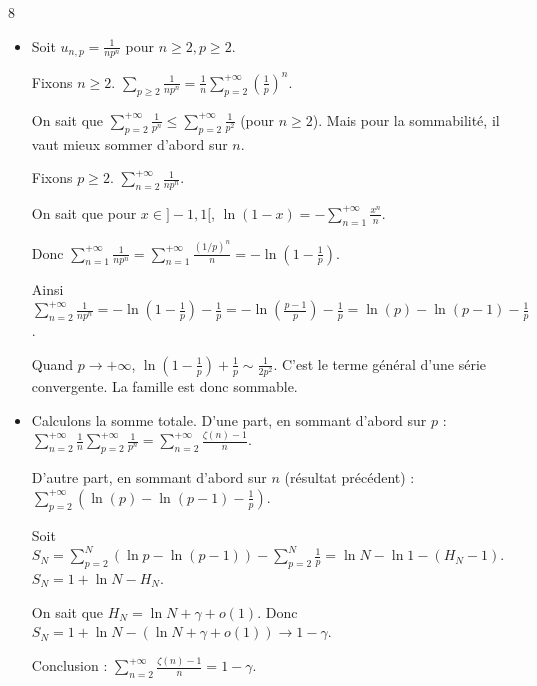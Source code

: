 \begin{correction}{8}
\begin{itemize}
    \item 
        Soit $u_{n,p} = \frac{1}{n p^n}$ pour $n \ge 2, p \ge 2$.

        Fixons $n \geqslant 2$. $\displaystyle \sum_{p \ge 2} \frac{1}{n p^n} = \frac{1}{n} \sum_{p=2}^{+\infty} \left(\frac{1}{p}\right)^n$.
        
        On sait que $\displaystyle \sum_{p=2}^{+\infty} \frac{1}{p^n} \le \sum_{p=2}^{+\infty} \frac{1}{p^2}$ (pour $n \ge 2$).
        Mais pour la sommabilité, il vaut mieux sommer d'abord sur $n$.
        
        Fixons $p \ge 2$. $\displaystyle\sum_{n=2}^{+\infty} \frac{1}{n p^n}$.
        
        On sait que pour $x \in ]-1,1[$, $\displaystyle\ln(1-x) = -\sum_{n=1}^{+\infty} \frac{x^n}{n}$.

        Donc $\displaystyle \sum_{n=1}^{+\infty} \frac{1}{n p^n} = \sum_{n=1}^{+\infty} \frac{(1/p)^n}{n} = -\ln\left(1-\frac{1}{p}\right)$.

        Ainsi $\displaystyle \sum_{n=2}^{+\infty} \frac{1}{n p^n} = -\ln\left(1-\frac{1}{p}\right) - \frac{1}{p} = -\ln\left(\frac{p-1}{p}\right) - \frac{1}{p} = \ln(p) - \ln(p-1) - \frac{1}{p}$.

        Quand $p \to +\infty$, $\ln\left(1-\frac{1}{p}\right) + \frac{1}{p} \sim \frac{1}{2p^2}$.
        C'est le terme général d'une série convergente.
        La famille est donc sommable.
    \item 
        Calculons la somme totale.
        D'une part, en sommant d'abord sur $p$ :
        $\displaystyle \sum_{n=2}^{+\infty} \frac{1}{n} \sum_{p=2}^{+\infty} \frac{1}{p^n} = \sum_{n=2}^{+\infty} \frac{\zeta(n)-1}{n}$.

        D'autre part, en sommant d'abord sur $n$ (résultat précédent) :
        $\displaystyle \sum_{p=2}^{+\infty} \left(\ln(p) - \ln(p-1) - \frac{1}{p}\right)$.
        
        Soit $\displaystyle S_N = \sum_{p=2}^N (\ln p - \ln(p-1)) - \sum_{p=2}^N \frac{1}{p} = \ln N - \ln 1 - (H_N - 1)$.
        $S_N = 1 + \ln N - H_N$.

        On sait que $H_N = \ln N + \gamma + o(1)$.
        Donc $S_N = 1 + \ln N - (\ln N + \gamma + o(1)) \to 1 - \gamma$.

        Conclusion : $\displaystyle \sum_{n=2}^{+\infty} \frac{\zeta(n)-1}{n} = 1-\gamma$.
\end{itemize}
\end{correction}

